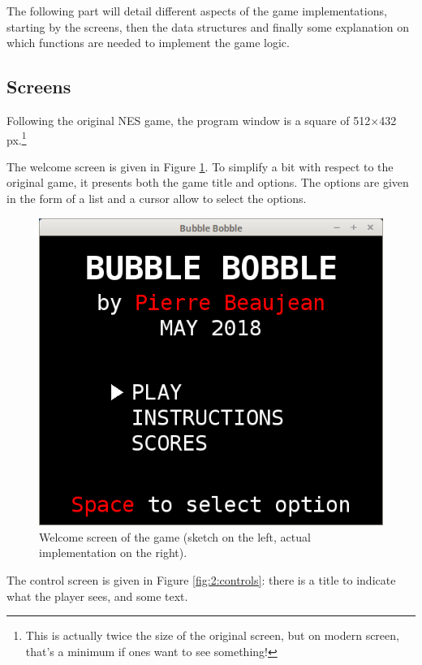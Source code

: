 \documentclass[12pt,a4paper]{article}
\begin{document}
The following part will detail different aspects of the game implementations, starting by the screens, then the data structures and finally some explanation on which functions are needed to implement the game logic.

\subsection{Screens}

Following the original NES game, the program window is a square of 512$\times$432 px.\footnote{This is actually twice the size of the original screen, but on modern screen, that's a minimum if ones want to see something!}

The welcome screen is given in Figure \ref{fig:1:welcome}. To simplify a bit with respect to the original game, it presents both the game title and options. The options are given in the form of a list and a cursor allow to select the options.

\begin{figure}[!h]
	\centering
	\hspace{.5cm}
	\includegraphics[width=.45\linewidth]{i/screen1}
	
	\caption{Welcome screen of the game (sketch on the left, actual implementation on the right).}
	\label{fig:1:welcome}
\end{figure}

The control screen is given in Figure \ref{fig:2:controls}: there is a title to indicate what the player sees, and some text.
\end{document}
